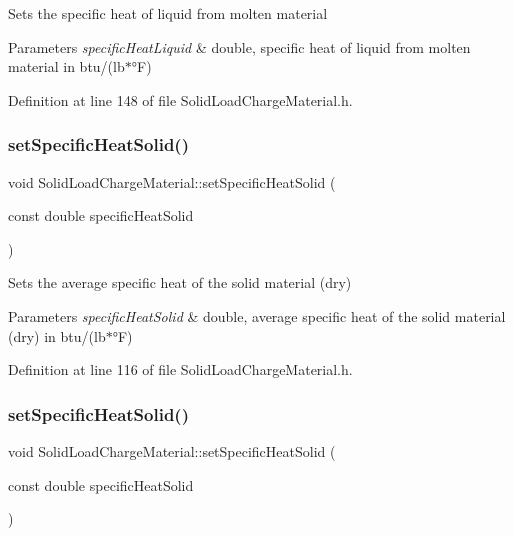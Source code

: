 Sets the specific heat of liquid from molten material 
\begin{DoxyParams}{Parameters}
{\em specific\+Heat\+Liquid} & double, specific heat of liquid from molten material in btu/(lb$\ast$°F) \\
\hline
\end{DoxyParams}


Definition at line 148 of file Solid\+Load\+Charge\+Material.\+h.

\mbox{\label{class_solid_load_charge_material_ad9d2e3668a6a14700f4dced4882f98c0}} 
\subsubsection{\texorpdfstring{set\+Specific\+Heat\+Solid()}{setSpecificHeatSolid()}\hspace{0.1cm}{\footnotesize\ttfamily [1/3]}}
{\footnotesize\ttfamily void Solid\+Load\+Charge\+Material\+::set\+Specific\+Heat\+Solid (\begin{DoxyParamCaption}\item[{const double}]{specific\+Heat\+Solid }\end{DoxyParamCaption})\hspace{0.3cm}{\ttfamily [inline]}}

Sets the average specific heat of the solid material (dry) 
\begin{DoxyParams}{Parameters}
{\em specific\+Heat\+Solid} & double, average specific heat of the solid material (dry) in btu/(lb$\ast$°F) \\
\hline
\end{DoxyParams}


Definition at line 116 of file Solid\+Load\+Charge\+Material.\+h.

\mbox{\label{class_solid_load_charge_material_ad9d2e3668a6a14700f4dced4882f98c0}} 
\subsubsection{\texorpdfstring{set\+Specific\+Heat\+Solid()}{setSpecificHeatSolid()}\hspace{0.1cm}{\footnotesize\ttfamily [2/3]}}
{\footnotesize\ttfamily void Solid\+Load\+Charge\+Material\+::set\+Specific\+Heat\+Solid (\begin{DoxyParamCaption}\item[{const double}]{specific\+Heat\+Solid }\end{DoxyParamCaption})\hspace{0.3cm}{\ttfamily [inline]}}

